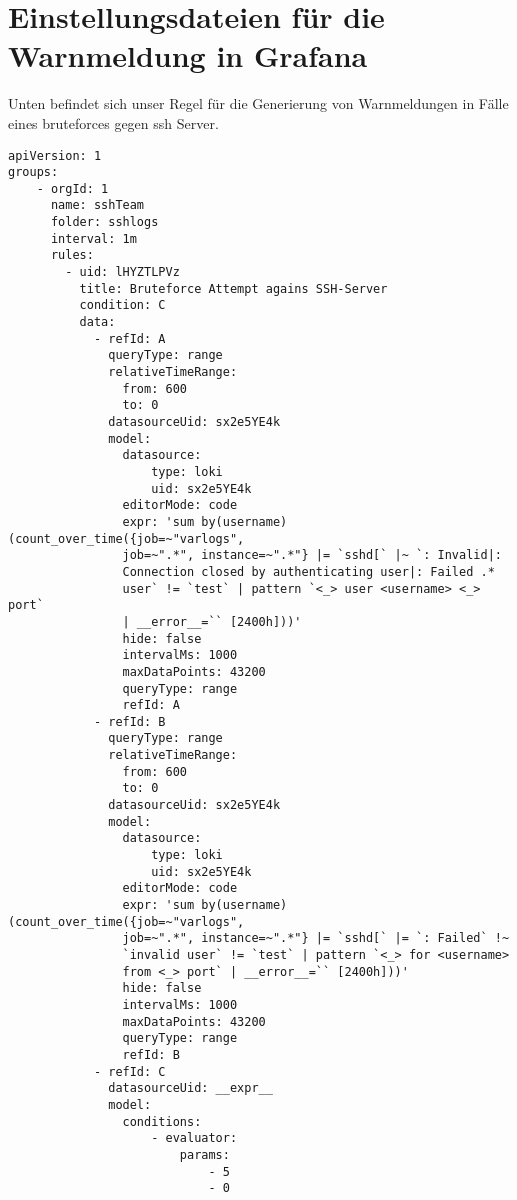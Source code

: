 \section{Einstellungsdateien für die Warnmeldung in Grafana}\label{appendix:Warnmedungskonfiguration}

Unten befindet sich unser Regel für die Generierung von Warnmeldungen in Fälle eines \gls{bruteforce}s gegen \gls{ssh} Server.

{
\begin{Verbatim}[frame=single,fontsize=\small]
apiVersion: 1
groups:
    - orgId: 1
      name: sshTeam
      folder: sshlogs
      interval: 1m
      rules:
        - uid: lHYZTLPVz
          title: Bruteforce Attempt agains SSH-Server
          condition: C
          data:
            - refId: A
              queryType: range
              relativeTimeRange:
                from: 600
                to: 0
              datasourceUid: sx2e5YE4k
              model:
                datasource:
                    type: loki
                    uid: sx2e5YE4k
                editorMode: code
                expr: 'sum by(username) (count_over_time({job=~"varlogs", 
                job=~".*", instance=~".*"} |= `sshd[` |~ `: Invalid|: 
                Connection closed by authenticating user|: Failed .* 
                user` != `test` | pattern `<_> user <username> <_> port`
                | __error__=`` [2400h]))'
                hide: false
                intervalMs: 1000
                maxDataPoints: 43200
                queryType: range
                refId: A
            - refId: B
              queryType: range
              relativeTimeRange:
                from: 600
                to: 0
              datasourceUid: sx2e5YE4k
              model:
                datasource:
                    type: loki
                    uid: sx2e5YE4k
                editorMode: code
                expr: 'sum by(username) (count_over_time({job=~"varlogs", 
                job=~".*", instance=~".*"} |= `sshd[` |= `: Failed` !~ 
                `invalid user` != `test` | pattern `<_> for <username> 
                from <_> port` | __error__=`` [2400h]))'
                hide: false
                intervalMs: 1000
                maxDataPoints: 43200
                queryType: range
                refId: B
            - refId: C
              datasourceUid: __expr__
              model:
                conditions:
                    - evaluator:
                        params:
                            - 5
                            - 0

\end{Verbatim}}
